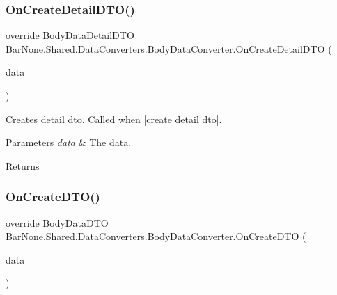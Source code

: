 \subsubsection{\texorpdfstring{On\+Create\+Detail\+D\+T\+O()}{OnCreateDetailDTO()}}
{\footnotesize\ttfamily override \mbox{\hyperlink{class_bar_none_1_1_shared_1_1_data_transfer_1_1_body_data_detail_d_t_o}{Body\+Data\+Detail\+D\+TO}} Bar\+None.\+Shared.\+Data\+Converters.\+Body\+Data\+Converter.\+On\+Create\+Detail\+D\+TO (\begin{DoxyParamCaption}\item[{\mbox{\hyperlink{class_bar_none_1_1_shared_1_1_domain_model_1_1_body_data}{Body\+Data}}}]{data }\end{DoxyParamCaption})}



Creates detail dto. Called when \mbox{[}create detail dto\mbox{]}. 


\begin{DoxyParams}{Parameters}
{\em data} & The data.\\
\hline
\end{DoxyParams}
\begin{DoxyReturn}{Returns}

\end{DoxyReturn}
\mbox{\label{class_bar_none_1_1_shared_1_1_data_converters_1_1_body_data_converter_a56568d5bfc4ba97f1c0860bd2f4b0855}} 
\subsubsection{\texorpdfstring{On\+Create\+D\+T\+O()}{OnCreateDTO()}}
{\footnotesize\ttfamily override \mbox{\hyperlink{class_bar_none_1_1_shared_1_1_data_transfer_1_1_body_data_d_t_o}{Body\+Data\+D\+TO}} Bar\+None.\+Shared.\+Data\+Converters.\+Body\+Data\+Converter.\+On\+Create\+D\+TO (\begin{DoxyParamCaption}\item[{\mbox{\hyperlink{class_bar_none_1_1_shared_1_1_domain_model_1_1_body_data}{Body\+Data}}}]{data }\end{DoxyParamCaption})}



